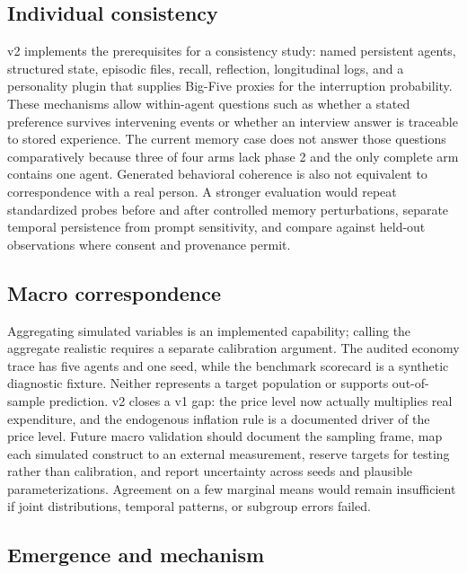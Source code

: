 \subsection{Individual consistency}

v2 implements the prerequisites for a consistency study: named persistent
agents, structured state, episodic files, recall, reflection, longitudinal
logs, and a personality plugin that supplies Big-Five proxies for the
interruption probability.  These mechanisms allow within-agent questions
such as whether a stated preference survives intervening events or whether
an interview answer is traceable to stored experience.  The current memory
case does not answer those questions comparatively because three of four
arms lack phase 2 and the only complete arm contains one agent.  Generated
behavioral coherence is also not equivalent to correspondence with a real
person.  A stronger evaluation would repeat standardized probes before and
after controlled memory perturbations, separate temporal persistence from
prompt sensitivity, and compare against held-out observations where consent
and provenance permit.

\subsection{Macro correspondence}

Aggregating simulated variables is an implemented capability; calling the
aggregate realistic requires a separate calibration argument.  The audited
economy trace has five agents and one seed, while the benchmark scorecard
is a synthetic diagnostic fixture.  Neither represents a target population
or supports out-of-sample prediction.  v2 closes a v1 gap: the price level
now actually multiplies real expenditure, and the endogenous inflation rule
is a documented driver of the price level.  Future macro validation should
document the sampling frame, map each simulated construct to an external
measurement, reserve targets for testing rather than calibration, and
report uncertainty across seeds and plausible parameterizations.  Agreement
on a few marginal means would remain insufficient if joint distributions,
temporal patterns, or subgroup errors failed.

\subsection{Emergence and mechanism}


